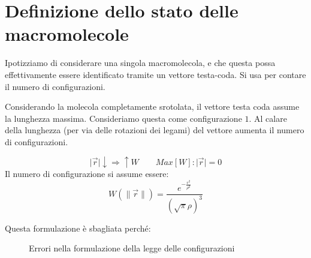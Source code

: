 \section{Definizione dello stato delle macromolecole}
Ipotizziamo di considerare una singola macromolecola, e che questa possa effettivamente essere identificato tramite un vettore testa-coda.
Si usa per contare il numero di configurazioni.

Considerando la molecola completamente srotolata, il vettore testa coda assume la lunghezza massima. Consideriamo questa come configurazione $1$.
Al calare della lunghezza (per via delle rotazioni dei legami) del vettore aumenta il numero di configurazioni.

\begin{equation}
\lvert\vec{r}\rvert\downarrow \Rightarrow \uparrow W \qquad Max[W]:\lvert\vec{r}\rvert = 0
\end{equation}
Il numero di configurazione si assume essere:
\begin{equation}
W(\lVert\vec{r}\rVert) = \frac{e^{-\frac{r^2}{\rho^2}}}{(\sqrt{\pi}\rho)^3}
\end{equation}

Questa formulazione è sbagliata perché:
\begin{figure}
\centering
{}\quad
{}
\caption{Errori nella formulazione della legge delle configurazioni}
\label{fig:ErroreLeggeConfigurazioni}
\end{figure}


